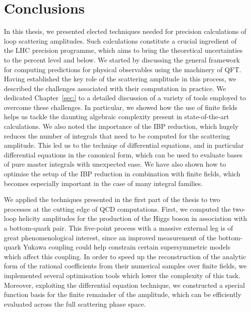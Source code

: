 \documentclass[main.tex]{subfiles}
\begin{document}
\chapter{Conclusions} \label{sec:conclusions}
In this thesis, we presented elected techniques needed for precision calculations of loop scattering amplitudes. Such calculations constitute a crucial ingredient of the LHC precision programme, which aims to bring the theoretical uncertainties to the percent level and below. We started by discussing the general framework for computing predictions for physical observables using the machinery of QFT. Having established the key role of the scattering amplitude in this process, we described the challenges associated with their computation in practice. We dedicated Chapter~\ref{sec:} to a detailed discussion of a variety of tools employed to overcome these challenges. In particular, we showed how the use of finite fields helps us tackle the daunting algebraic complexity present in state-of-the-art calculations. We also noted the importance of the IBP reduction, which hugely reduces the number of integrals that need to be computed for the scattering amplitude. This led us to the techniqe of differential equations, and in particular differential equations in the canonical form, which can be used to evaluate bases of pure master integrals with unexpected ease. We have also shown how to optimise the setup of the IBP reduction in combination with finite fields, which becomes especially important in the case of many integral families.

We applied the techniques presented in the first part of the thesis to two processes at the cutting edge of QCD computations. First, we computed the two-loop helicity amplitudes for the production of the Higgs boson in association with a bottom-quark pair. This five-point process with a massive external leg is of great phenomenological interest, since an improved measurement of the bottom-quark Yukawa coupling could help constrain certain supersymmetric models which affect this coupling. In order to speed up the reconstruction of the analytic form of the rational coefficients from their numerical samples over finite fields, we implemented several optimisation tools which lower the complexity of this task. Moreover, exploiting the differential equation technique, we constructed a special function basis for the finite remainder of the amplitude, which can be efficiently evaluated across the full scattering phase space.
\end{document}
